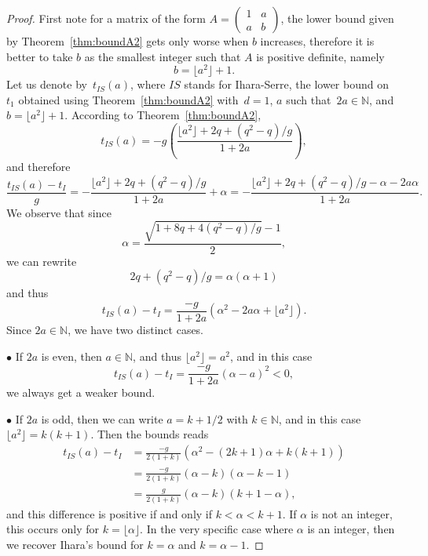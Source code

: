 \documentclass{amsart}
\newcommand{\N}{\mathbb{N}}
\newcommand{\newlowerbound}{t_{IS}}
\begin{document}
\begin{proof}

First note for a matrix of the form $A = \begin{pmatrix}
1 & a \\ a & b
\end{pmatrix}$, the lower bound given by Theorem~\ref{thm:boundA2} gets only worse when $b$ increases, therefore it is better to take $b$ as the smallest integer such that $A$ is positive definite, namely
$$
b = \lfloor a^2 \rfloor + 1.
$$
Let us denote by~$\newlowerbound(a)$, where $IS$ stands for Ihara-Serre, the lower bound on~$t_1$ obtained using Theorem~\ref{thm:boundA2} with~$d=1$,
$a$ such that~$2a\in\N$, and~$b = \lfloor a^2 \rfloor + 1$.
According to Theorem~\ref{thm:boundA2}, 
\[
\newlowerbound(a) = -g\left(\frac{\lfloor a^2 \rfloor + 2q + (q^2-q)/g}{1+2a}\right),
\]
and therefore
\[
\frac{\newlowerbound(a)-t_I}{g}= - \frac{\lfloor a^2 \rfloor + 2q + (q^2-q)/g}{1+2a} + \alpha = - \frac{\lfloor a^2 \rfloor + 2q + (q^2-q)/g - \alpha - 2 a \alpha}{1+2a}.
\]
We observe that since 
\[\alpha = \frac{\sqrt{1+8q+4(q^2-q)/g}-1}{2},\]
we can rewrite
\[
2q + (q^2-q)/g = \alpha(\alpha + 1)
\]
and thus
$$
\newlowerbound(a)-t_I=\frac{-g}{1+2a}\left(\alpha^2-2a\alpha+\lfloor a^2 \rfloor\right).
$$
Since $2a \in \N$, we have two distinct cases.



$\bullet$ If $2a$ is even, then $a\in \N$, and thus $\lfloor a^2 \rfloor = a^2$, and in this case 
\[
\newlowerbound(a)-t_I = \frac{-g}{1+2a}\left(\alpha - a \right)^2 <0,
\]
we always get a weaker bound.


$\bullet$ If $2a$ is odd, then we can write $a = k +1/2$ with $k\in\N$, and in this case $\lfloor a^2 \rfloor = k(k+1)$. 
Then the bounds reads
\begin{align*}
\newlowerbound(a)-t_I &= \frac{-g}{2(1+k)}\left(\alpha^2 - (2k+1)\alpha + k(k+1) \right)
\\  &= \frac{-g}{2(1+k)}\left(\alpha - k \right)\left(\alpha - k - 1 \right)
\\  &= \frac{g}{2(1+k)}\left(\alpha - k \right)\left(k+1 - \alpha \right)
,
\end{align*}
and this difference is positive if and only if $k < \alpha < k+1$.
If $\alpha$ is not an integer, this occurs only for $k = \lfloor \alpha \rfloor$.
In the very specific case where $\alpha$ is an integer, then we recover Ihara's bound for $k = \alpha$ and $k = \alpha -1$.
\end{proof}
\end{document}
